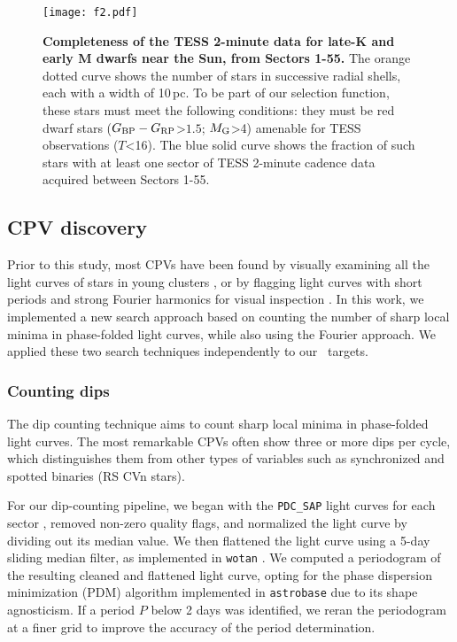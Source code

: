 \documentclass[11pt,twocolumn,tighten]{aastex63}
\newcommand{\bprp}{G_{\rm BP} - G_{\rm RP}}
\begin{document}
\begin{figure}[!t]
	\begin{center}
		\centering
		\texttt{[image: f2.pdf]}
		\vspace{-0.2cm}
		\caption{
      {\bf Completeness of the TESS 2-minute data for late-K and early
      M dwarfs near the Sun, from Sectors 1-55.}  The orange dotted
      curve shows the number of stars in successive radial shells,
      each with a width of 10\,pc.  To be part of our selection
      function, these stars must meet the following conditions: they
      must be red dwarf stars ($\bprp$>$1.5$; $M_{\rm G}$>4) amenable
      for TESS observations ($T$<16).  The blue solid curve shows the
      fraction of such stars with at least one sector of TESS 2-minute
      cadence data acquired between Sectors 1-55.
		}
			\vspace{-0.5cm}
		\label{fig:completeness}
	\end{center}
\end{figure}



\subsection{CPV discovery}
\label{subsec:discoverymethods}

Prior to this study, most CPVs have been found by visually examining
all the light curves of stars in young clusters
\citep{2016AJ....152..114R,2017AJ....153..152S,2023ApJ...945..114P},
or by flagging light curves with short periods and strong Fourier
harmonics for visual inspection \citep{2019ApJ...876..127Z}.  In this
work, we implemented a new search approach based on counting the
number of sharp local minima in phase-folded light curves, while also
using the Fourier approach.  We applied these two search techniques
independently to our \nstarssearched\ targets.


\subsubsection{Counting dips}
\label{subsec:counting}

The dip counting technique aims to count sharp local minima in
phase-folded light curves.  The most remarkable CPVs often show three
or more dips per cycle, which distinguishes them from other types of
variables such as synchronized and spotted binaries (RS CVn stars).

For our dip-counting pipeline, we began with the {\tt PDC\_SAP} light
curves for each sector \citep{2017ksci.rept....8S}, removed non-zero
quality flags, and normalized the light curve by dividing out its
median value.  We then flattened the light curve using a 5-day sliding
median filter, as implemented in \texttt{wotan}
\citep{2019AJ....158..143H}.  We computed a periodogram of the
resulting cleaned and flattened light curve, opting for the
\citet{1978ApJ...224..953S} phase dispersion minimization (PDM)
algorithm implemented in \texttt{astrobase}
\citep{2021zndo...1011188B} due to its shape agnosticism.  If a period
$P$ below 2 days was identified, we reran the periodogram at a finer
grid to improve the accuracy of the period determination.
\end{document}

